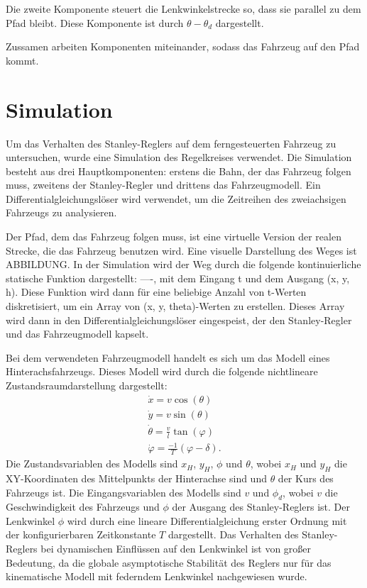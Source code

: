 \documentclass[arbeit=studie,oneside,BCOR=12mm]{ArbeitRST}
\begin{document}
Die zweite Komponente steuert die Lenkwinkelstrecke so, dass sie parallel zu
dem Pfad bleibt. Diese Komponente ist durch $\theta - \theta_d$ dargestellt.

Zussamen arbeiten Komponenten miteinander, sodass das Fahrzeug auf den Pfad
kommt. 







\section{Simulation}


Um das Verhalten des Stanley-Reglers auf dem ferngesteuerten Fahrzeug zu 
untersuchen, wurde eine Simulation des Regelkreises verwendet.
Die Simulation besteht aus drei Hauptkomponenten: erstens die Bahn, der das 
Fahrzeug folgen muss, zweitens der Stanley-Regler und drittens das 
Fahrzeugmodell. Ein Differentialgleichungslöser wird verwendet, um die 
Zeitreihen des zweiachsigen Fahrzeugs zu analysieren. 

Der Pfad, dem das Fahrzeug folgen muss, ist eine virtuelle Version der realen 
Strecke, die das Fahrzeug benutzen wird. Eine visuelle Darstellung des Weges 
ist ABBILDUNG. In der Simulation wird der Weg durch die folgende kontinuierliche
statische Funktion dargestellt:
----, 
mit dem Eingang t und dem Ausgang (x, y, h). Diese Funktion wird dann für eine 
beliebige Anzahl von t-Werten diskretisiert, um ein Array von 
(x, y, theta)-Werten zu erstellen. Dieses Array wird dann in den 
Differentialgleichungslöser eingespeist, der den Stanley-Regler und das 
Fahrzeugmodell kapselt. 

Bei dem verwendeten Fahrzeugmodell handelt es sich um das Modell eines 
Hinterachsfahrzeugs. Dieses Modell wird durch die folgende nichtlineare 
Zustandsraumdarstellung dargestellt:
\begin{gather}
    \dot{x} = v \cos(\theta) \\
    \dot{y} = v \sin(\theta) \\
    \dot{\theta} = \frac{v}{l}\tan(\varphi) \\
    \dot{\varphi} = \frac{-1}{T}\left(\varphi - \delta\right).
\end{gather}
Die Zustandsvariablen des Modells sind $x_H$, $y_H$, $\phi$ und $\theta$, wobei 
$x_H$ und $y_H$ die 
XY-Koordinaten des Mittelpunkts der Hinterachse sind und $\theta$ der Kurs des 
Fahrzeugs ist. Die Eingangsvariablen des 
Modells sind $v$ und $\phi_d$, wobei $v$ die Geschwindigkeit des Fahrzeugs und 
$\phi$ der 
Ausgang des Stanley-Reglers ist. Der Lenkwinkel $\phi$ wird durch eine lineare 
Differentialgleichung erster Ordnung mit der konfigurierbaren Zeitkonstante $T$ 
dargestellt. Das Verhalten des Stanley-Reglers bei dynamischen Einflüssen auf 
den Lenkwinkel ist von großer Bedeutung, da die globale asymptotische Stabilität
des Reglers nur für das kinematische Modell mit federndem Lenkwinkel 
nachgewiesen wurde. 
\end{document}
